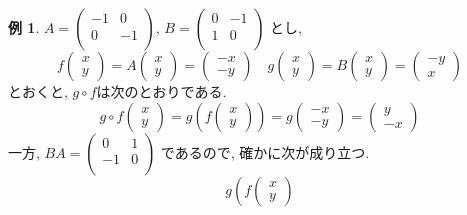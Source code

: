 \documentclass[dvipdfmx,a4paper,11pt]{article}
\theoremstyle{definition}
\newtheorem{exa}[thm]{例}
\begin{document}
 
  \begin{exa}
$
A=\begin{pmatrix}
-1& 0 \\
0& -1 \\
\end{pmatrix}
$, 
$
B=
\begin{pmatrix}
0& -1 \\
1& 0 \\
\end{pmatrix}
$
とし, 
$$
f\begin{pmatrix}
x \\ y
 \end{pmatrix} 
 =
 A
\begin{pmatrix}
x \\ y
 \end{pmatrix}  
 = 
 \begin{pmatrix}
-x \\ -y
 \end{pmatrix} 
\quad
g\begin{pmatrix}
x \\ y
 \end{pmatrix} 
 =
 B
\begin{pmatrix}
x \\ y
 \end{pmatrix}  
 =
 \begin{pmatrix}
-y \\ x
 \end{pmatrix} 
 $$
とおくと, $g \circ f$は次のとおりである. 
 $$
 g\circ f 
 \begin{pmatrix}
x \\ y
 \end{pmatrix}  
 = g \left( 
 f\begin{pmatrix}
x \\ y
 \end{pmatrix} 
 \right)
 =g \begin{pmatrix}
-x \\ -y
 \end{pmatrix} 
 =
  \begin{pmatrix}
y \\ -x
 \end{pmatrix} 
 $$
一方, $BA = 
\begin{pmatrix}
0& 1 \\
-1& 0 \\
\end{pmatrix}
$
であるので, 確かに次が成り立つ.
$$g \left( 
 f\begin{pmatrix}
x \\ y
 \end{pmatrix} 
$$
\end{exa}
\end{document}
